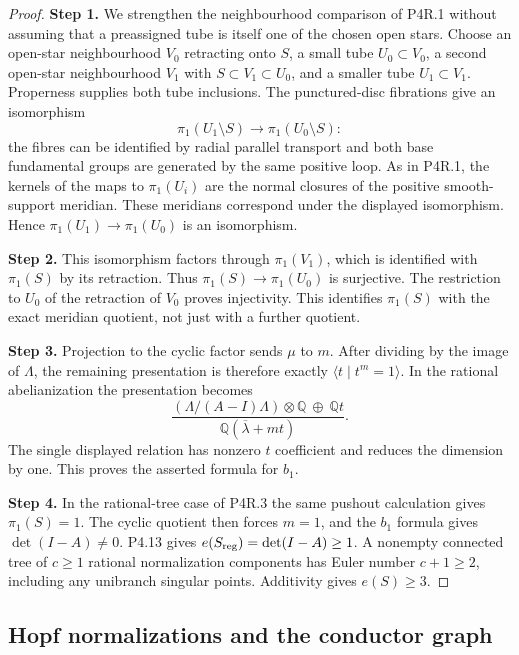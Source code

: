 \begin{proof}
\noindent\textbf{Step 1.} We strengthen the neighbourhood comparison of P4R.1
without assuming that a preassigned tube is itself
one of the chosen open stars. Choose an open-star
neighbourhood $V_0$ retracting onto $S$, a small tube
$U_0\subset V_0$, a second open-star neighbourhood
$V_1$ with $S\subset V_1\subset U_0$, and a smaller
tube $U_1\subset V_1$. Properness supplies both tube
inclusions. The punctured-disc fibrations give an
isomorphism
\[
 \pi_1(U_1\setminus S)\longrightarrow
 \pi_1(U_0\setminus S):
\]
the fibres can be identified by radial parallel
transport and both base fundamental groups are
generated by the same positive loop. As in P4R.1,
the kernels of the maps to $\pi_1(U_i)$ are the
normal closures of the positive smooth-support
meridian. These meridians correspond under the
displayed isomorphism. Hence
$\pi_1(U_1)\to\pi_1(U_0)$ is an isomorphism.

\noindent\textbf{Step 2.} This isomorphism factors through $\pi_1(V_1)$,
which is identified with $\pi_1(S)$ by its
retraction. Thus $\pi_1(S)\to\pi_1(U_0)$ is
surjective. The restriction to $U_0$ of the
retraction of $V_0$ proves injectivity. This
identifies $\pi_1(S)$ with the exact meridian
quotient, not just with a further quotient.

\noindent\textbf{Step 3.} Projection to the cyclic factor sends $\mu$ to
$m$. After dividing by the image of $\Lambda$,
the remaining presentation is therefore exactly
$\langle t\mid t^m=1\rangle$. In the rational
abelianization the presentation becomes
\[
 \frac{(\Lambda/(A-I)\Lambda)\otimes\mathbb Q
       \ \oplus\ \mathbb Qt}
      {\mathbb Q(\overline\lambda+mt)}.
\]
The single displayed relation has nonzero
$t$ coefficient and reduces the dimension by
one. This proves the asserted formula for $b_1$.

\noindent\textbf{Step 4.} In the rational-tree case of P4R.3 the same
pushout calculation gives $\pi_1(S)=1$.
The cyclic quotient then forces $m=1$, and the
$b_1$ formula gives $\det(I-A)\ne0$.
P4.13 gives
$e(S_{\rm reg})=\det(I-A)\ge1$.
A nonempty connected tree of $c\ge1$ rational
normalization components has Euler number
$c+1\ge2$, including any unibranch singular
points. Additivity gives $e(S)\ge3$.
\end{proof}

\subsection{Hopf normalizations and the conductor graph}

